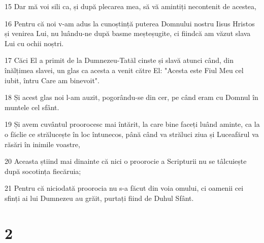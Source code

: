 \par 15 Dar mă voi sili ca, și după plecarea mea, să vă amintiți necontenit de acestea,
\par 16 Pentru că noi v-am adus la cunoștință puterea Domnului nostru Iisus Hristos și venirea Lui, nu luându-ne după basme meșteșugite, ci fiindcă am văzut slava Lui cu ochii noștri.
\par 17 Căci El a primit de la Dumnezeu-Tatăl cinste și slavă atunci când, din înălțimea slavei, un glas ca acesta a venit către El: "Acesta este Fiul Meu cel iubit, întru Care am binevoit".
\par 18 Și acest glas noi l-am auzit, pogorându-se din cer, pe când eram cu Domnul în muntele cel sfânt.
\par 19 Și avem cuvântul proorocesc mai întărit, la care bine faceți luând aminte, ca la o făclie ce strălucește în loc întunecos, până când va străluci ziua și Luceafărul va răsări în inimile voastre,
\par 20 Aceasta știind mai dinainte că nici o proorocie a Scripturii nu se tâlcuiește după socotința fiecăruia;
\par 21 Pentru că niciodată proorocia nu s-a făcut din voia omului, ci oamenii cei sfinți ai lui Dumnezeu au grăit, purtați fiind de Duhul Sfânt.

\chapter{2}

